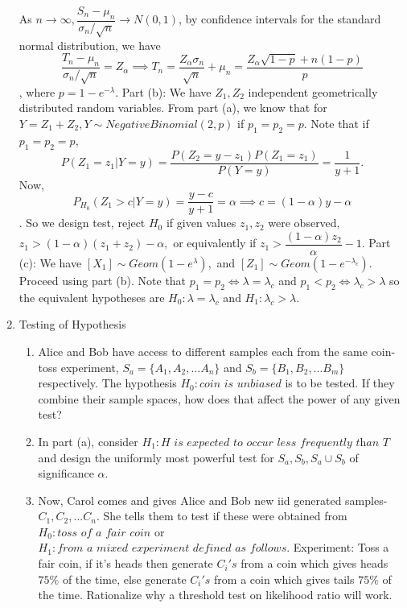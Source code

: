 \documentclass[12pt, oneside]{article}
\begin{document}
\begin{enumerate}
As $n \to \infty, \dfrac{S_n -\mu_n}{\sigma_n/ \sqrt{n}} \to N(0,1)$, by confidence intervals for the standard normal distribution, we have 
$$
\dfrac{T_n -\mu_n}{\sigma_n/ \sqrt{n}} = Z_{\alpha} \implies T_n = \dfrac{Z_{\alpha} \sigma_n}{\sqrt{n}} + \mu_n = \dfrac{Z_{\alpha} \sqrt{1-p} + n(1-p)}{p}
$$, where $p = 1 - e^{-\lambda}$.
\newline Part (b): We have $Z_1,Z_2$ independent geometrically distributed random variables. From part (a), we know that for $Y = Z_1 + Z_2, Y \sim NegativeBinomial(2,p)$ if $p_1=p_2=p$. 
Note that if $p_1=p_2=p$, $$P(Z_1 = z_1 | Y = y) = \dfrac{P(Z_2 = y - z_1)P(Z_1 = z_1)}{P(Y=y)} = \dfrac{1}{y+1}.$$
Now, $$
P_{H_0}(Z_1 > c | Y = y) = \dfrac{y-c}{y+1} = \alpha \implies c = (1-\alpha)y - \alpha
$$. 
So we design test, reject $H_0$ if given values $z_1,z_2$ were observed, $z_1 > (1-\alpha)(z_1 + z_2) - \alpha,$ or equivalently if $z_1 > \dfrac{(1-\alpha)z_2}{\alpha}-1$.
\newline Part (c): We have $[X_1] \sim Geom(1-e^{\lambda}),$ and $[Z_1] \sim Geom(1-e^{-\lambda_c})$. Proceed using part (b). Note that 
$p_1 = p_2 \iff \lambda = \lambda_c$ and $p_1 < p_2 \iff \lambda_c > \lambda$ so the equivalent hypotheses are $H_0: \lambda = \lambda_c$ and $H_1 : \lambda_c > \lambda$.

\item Testing of Hypothesis 
\begin{enumerate}
    \item Alice and Bob have access to different samples each from the same coin-toss experiment, $S_a = \{ A_1, A_2,...A_n \}$ and $S_b = \{ B_1,B_2,...B_m \}$ respectively. The hypothesis $H_0: \textit{coin is unbiased}$ is to be tested. If they combine their sample spaces, how does that affect the power of any given test? 
    \item In part (a), consider $H_1 : \textit{H is expected to occur less frequently than T}$ and design the uniformly most powerful test for $S_a, S_b, S_a \cup S_b$ of significance $\alpha$. %

    \item Now, Carol comes and gives Alice and Bob new iid generated samples- $C_1, C_2, ...C_n$. She tells them to test if these were obtained from $H_0: \textit{toss of a fair coin}$ or $H_1 : \textit{from a mixed experiment defined as follows.}$ 
    \newline Experiment: Toss a fair coin, if it's heads then generate $C_i's$ from a coin which gives heads $75\%$ of the time, else generate $C_i's$ from a coin which gives tails $75\%$ of the time. Rationalize why a threshold test on likelihood ratio will work.  
    

\end{enumerate}
\end{enumerate}
\end{document}
